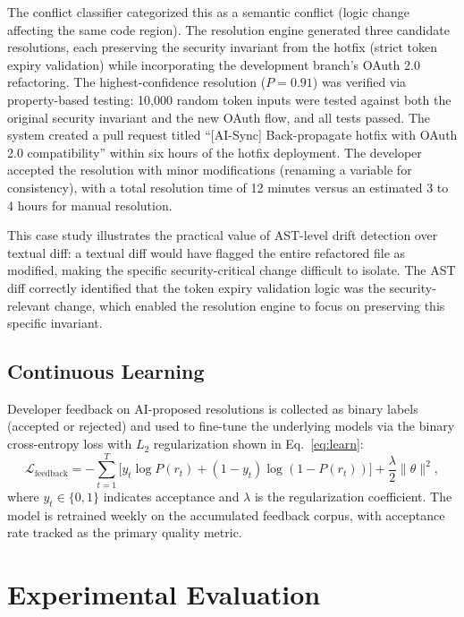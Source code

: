 \documentclass{ieeeaccess}
\begin{document}
The conflict classifier categorized this as a semantic conflict (logic change affecting the same code region). The resolution engine generated three candidate resolutions, each preserving the security invariant from the hotfix (strict token expiry validation) while incorporating the development branch's OAuth 2.0 refactoring. The highest-confidence resolution ($P = 0.91$) was verified via property-based testing: 10{,}000 random token inputs were tested against both the original security invariant and the new OAuth flow, and all tests passed. The system created a pull request titled ``[AI-Sync] Back-propagate hotfix with OAuth 2.0 compatibility'' within six hours of the hotfix deployment. The developer accepted the resolution with minor modifications (renaming a variable for consistency), with a total resolution time of 12 minutes versus an estimated 3 to 4 hours for manual resolution.

This case study illustrates the practical value of AST-level drift detection over textual diff: a textual diff would have flagged the entire refactored file as modified, making the specific security-critical change difficult to isolate. The AST diff correctly identified that the token expiry validation logic was the security-relevant change, which enabled the resolution engine to focus on preserving this specific invariant.

\subsection{Continuous Learning}
Developer feedback on AI-proposed resolutions is collected as binary labels (accepted or rejected) and used to fine-tune the underlying models via the binary cross-entropy loss with $L_2$ regularization shown in Eq.~\eqref{eq:learn}:
\begin{equation}
\mathcal{L}_{\mathrm{feedback}} = -\sum_{t=1}^{T} \bigl[ y_t \log P(r_t) + (1 - y_t) \log(1 - P(r_t)) \bigr] + \frac{\lambda}{2} \lVert \theta \rVert^{2},
\label{eq:learn}
\end{equation}
where $y_t \in \{0, 1\}$ indicates acceptance and $\lambda$ is the regularization coefficient. The model is retrained weekly on the accumulated feedback corpus, with acceptance rate tracked as the primary quality metric.

\section{Experimental Evaluation}
\label{sec:eval}
\end{document}
